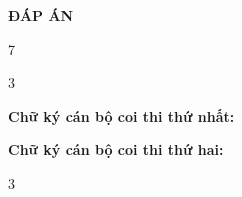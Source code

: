 \documentclass[11pt]{article}
\begin{document}
 \nohovaten{}
% 
%  
% 
\lamtieude
\indebai
\begin{enumerate}[]
\foreachproblem[101]{\item\causo\thisproblem}
\foreachproblem[102]{\item\causo\thisproblem}
 \end{enumerate}
\label{dbPage}
\newpage
\setlength{\columnsep}{2pt}
\lamtieude
\begin{center}
\textbf{ĐÁP ÁN}
\end{center}
\indapanso
\begin{center}
\begin{multicols}{7}
\begin{enumerate}[\socau]
\foreachproblem[101]{\item\thisproblem}
\foreachproblem[102]{\item\thisproblem}
\end{enumerate}
\end{multicols}
\end{center}



\newpage

\inphieuthi
\lamphieuthi
\begin{center}
\begin{multicols}{3}
\begin{enumerate}[\causo]
\foreachproblem[101]{\item\thisproblem}
\foreachproblem[102]{\item\thisproblem}
\end{enumerate}
\end{multicols}
\end{center}

\vspace*{3cm}
\textbf{Chữ ký cán bộ coi thi thứ nhất:}

\vspace*{1cm}
\textbf{Chữ ký cán bộ coi thi thứ hai:}







\newpage
\inphieuduclo
\lamphieuthi
\begin{center}
\begin{multicols}{3}
\begin{enumerate}[\causo]
\foreachproblem[101]{\item\thisproblem}
\foreachproblem[102]{\item\thisproblem}
\end{enumerate}
\end{multicols}
\end{center}
\end{document}
